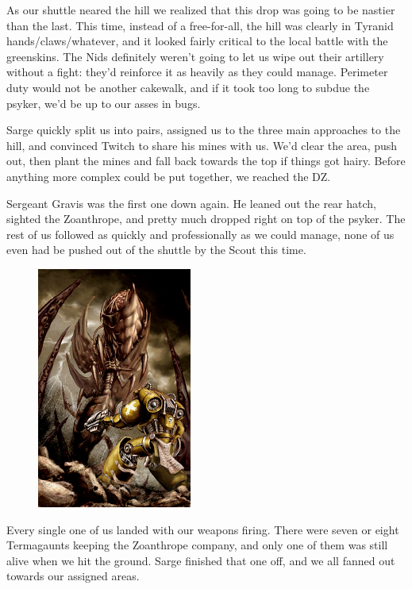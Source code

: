 As our shuttle neared the hill we realized that this drop was going to be nastier than the last. 
This time, instead of a free-for-all, the hill was clearly in Tyranid hands/claws/whatever, and it looked fairly critical to the local battle with the greenskins. 
The Nids definitely weren't going to let us wipe out their artillery without a fight: 
they'd reinforce it as heavily as they could manage. 
Perimeter duty would not be another cakewalk, and if it took too long to subdue the psyker, we'd be up to our asses in bugs.

Sarge quickly split us into pairs, assigned us to the three main approaches to the hill, and convinced Twitch to share his mines with us. 
We'd clear the area, push out, then plant the mines and fall back towards the top if things got hairy. 
Before anything more complex could be put together, we reached the DZ.

Sergeant Gravis was the first one down again. 
He leaned out the rear hatch, sighted the Zoanthrope, and pretty much dropped right on top of the psyker. 
The rest of us followed as quickly and professionally as we could manage, none of us even had be pushed out of the shuttle by the Scout this time. 


\begin{figure}
	\begin{center}
		\includegraphics[width=\figwidth]{pics/12/42.png}
	\end{center}
\end{figure}
Every single one of us landed with our weapons firing. 
There were seven or eight Termagaunts keeping the Zoanthrope company, and only one of them was still alive when we hit the ground. 
Sarge finished that one off, and we all fanned out towards our assigned areas. 


